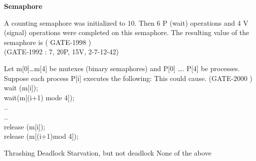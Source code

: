 \centerline{\textbf{ \LARGE Semaphore }}

\setcounter{question}{0}



\begin{minipage}{\linewidth}

  \question  A counting semaphore was initialized to 10. Then 6 P (wait) operations and 4 V (signal) operations were completed on this semaphore. The resulting value of the semaphore is ( GATE-1998 )
  \\ (GATE-1992 :  7, 20P, 15V, 2-7-12-42)
  \begin{choices}
  \end{choices}

  \end{minipage}

\vspace{0.08in}

\begin{minipage}{\linewidth}

  \question   Let m[0]…m[4] be mutexes (binary semaphores) and P[0] …. P[4] be processes.
              Suppose each process P[i] executes the following: This could cause. (GATE-2000 ) \\
              wait (m[i]); \\
              wait(m[(i+1) mode 4]); \\
              ..\\
              ..\\
              release (m[i]);\\
              release (m[(i+1)mod 4]);

  \begin{oneparchoices}
    \choice Thrashing
    \choice Deadlock
    \choice Starvation, but not deadlock
    \choice None of the above
  \end{oneparchoices}

  \end{minipage}

\vspace{0.08in}

